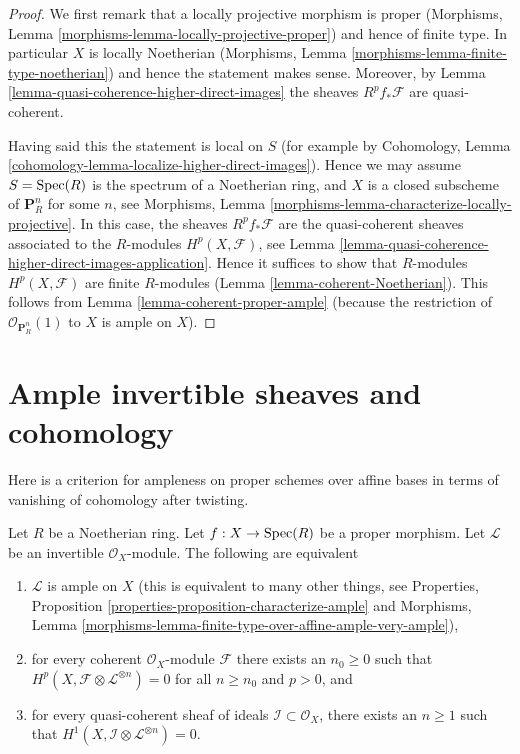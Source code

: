 \begin{proof}
We first remark that a locally projective morphism is proper
(Morphisms, Lemma \ref{morphisms-lemma-locally-projective-proper})
and hence of finite type.
In particular $X$ is locally Noetherian
(Morphisms, Lemma \ref{morphisms-lemma-finite-type-noetherian})
and hence the statement makes sense.
Moreover, by Lemma \ref{lemma-quasi-coherence-higher-direct-images}
the sheaves $R^pf_*\mathcal{F}$ are quasi-coherent.

\medskip\noindent
Having said this the statement is local on $S$ (for example by
Cohomology, Lemma \ref{cohomology-lemma-localize-higher-direct-images}).
Hence we may assume $S = \mathop{\mathrm{Spec}}(R)$ is the spectrum of
a Noetherian ring, and $X$ is a closed subscheme of
$\mathbf{P}^n_R$ for some $n$, see
Morphisms, Lemma \ref{morphisms-lemma-characterize-locally-projective}.
In this case, the sheaves $R^pf_*\mathcal{F}$ are the quasi-coherent
sheaves associated to the $R$-modules $H^p(X, \mathcal{F})$, see
Lemma \ref{lemma-quasi-coherence-higher-direct-images-application}.
Hence it suffices to show that $R$-modules $H^p(X, \mathcal{F})$
are finite $R$-modules (Lemma \ref{lemma-coherent-Noetherian}).
This follows from Lemma \ref{lemma-coherent-proper-ample}
(because the restriction of $\mathcal{O}_{\mathbf{P}^n_R}(1)$
to $X$ is ample on $X$).
\end{proof}








\section{Ample invertible sheaves and cohomology}
\label{section-ample-cohomology}

\noindent
Here is a criterion for ampleness on proper schemes over affine bases
in terms of vanishing of cohomology after twisting.

\begin{lemma}
\label{lemma-vanshing-gives-ample}
\begin{reference}
\cite[III Proposition 2.6.1]{EGA}
\end{reference}
Let $R$ be a Noetherian ring. Let $f : X \to \mathop{\mathrm{Spec}}(R)$ be a proper morphism.
Let $\mathcal{L}$ be an invertible $\mathcal{O}_X$-module.
The following are equivalent
\begin{enumerate}
\item $\mathcal{L}$ is ample on $X$ (this is equivalent to many other
things, see
Properties, Proposition \ref{properties-proposition-characterize-ample} and
Morphisms, Lemma
\ref{morphisms-lemma-finite-type-over-affine-ample-very-ample}),
\item for every coherent $\mathcal{O}_X$-module $\mathcal{F}$ there exists
an $n_0 \geq 0$ such that
$H^p(X, \mathcal{F} \otimes \mathcal{L}^{\otimes n}) = 0$ for all $n \geq n_0$
and $p > 0$, and
\item for every quasi-coherent sheaf of ideals
$\mathcal{I} \subset \mathcal{O}_X$, there exists an $n \geq 1$
such that $H^1(X, \mathcal{I} \otimes \mathcal{L}^{\otimes n}) = 0$.
\end{enumerate}
\end{lemma}


